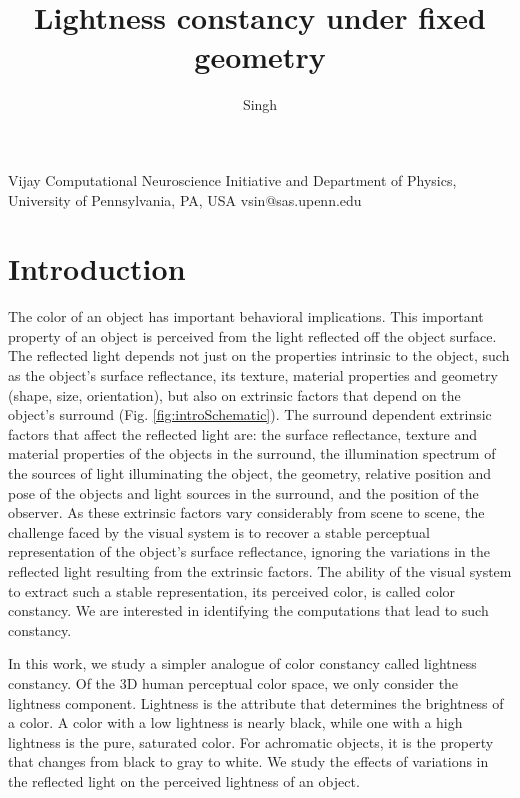 \documentclass{jov}
\begin{document}
\title{Lightness constancy under fixed geometry}

\author{Singh}{Vijay}
 {Computational Neuroscience Initiative}
 {and Department of Physics, University of Pennsylvania, PA, USA}
 {}{vsin@sas.upenn.edu}


\maketitle

\section{Introduction}
The color of an object has important behavioral implications. This important property of an object is perceived from the light reflected off the object surface. The reflected light depends not just on the properties intrinsic to the object, such as the object's surface reflectance, its texture, material properties and geometry (shape, size, orientation), but also on extrinsic factors that depend on the object's surround (Fig. \ref{fig:introSchematic}). The surround dependent extrinsic factors that affect the reflected light are: the surface reflectance, texture and material properties of the objects in the surround, the illumination spectrum of the sources of light illuminating the object, the geometry, relative position and pose of the objects and light sources in the surround, and the position of the observer. As these extrinsic factors vary considerably from scene to scene, the challenge faced by the visual system is to recover a stable perceptual representation of the object's surface reflectance, ignoring the  variations in the reflected light resulting from the extrinsic factors. The ability of the visual system to extract such a stable representation, its perceived color, is called color constancy. We are interested in identifying the computations that lead to such constancy.

In this work, we study a simpler analogue of color constancy called lightness constancy. Of the 3D human perceptual color space, we only consider the lightness component. Lightness is the attribute that determines the brightness of a color. A color with a low lightness is nearly black, while one with a high lightness is the pure, saturated color. For achromatic objects, it is the property that changes from black to gray to white. We study the effects of variations in the reflected light on the perceived lightness of an object.
\end{document}
